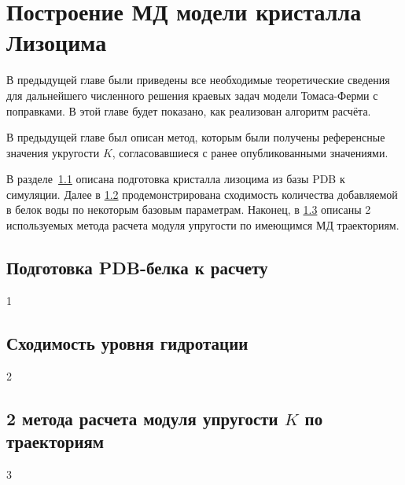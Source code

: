 \chapter{Построение МД модели кристалла Лизоцима}
\label{Sec:Calculation}

В предыдущей главе были приведены все необходимые теоретические сведения для дальнейшего численного решения краевых задач модели Томаса-Ферми с поправками. В этой главе будет показано, как реализован алгоритм расчёта.

В предыдущей главе был описан метод, которым были получены референсные значения укругости $K$, согласовавшиеся с ранее опубликованными значениями.

В разделе~\ref{Subsec:CalculationPrep} описана подготовка кристалла лизоцима из базы PDB к симуляции. Далее в \ref{Subsec:CalculationConverge} продемонстрирована сходимость количества добавляемой в белок воды по некоторым базовым параметрам. Наконец, в \ref{Subsec:Calculation2ways} описаны 2 используемых метода расчета модуля упругости по имеющимся МД траекториям.

\section{Подготовка PDB-белка к расчету}
\label{Subsec:CalculationPrep}

1

\section{Сходимость уровня гидротации}
\label{Subsec:CalculationConverge}

2

\section{2 метода расчета модуля упругости $K$ по траекториям}
\label{Subsec:Calculation2ways}

3
